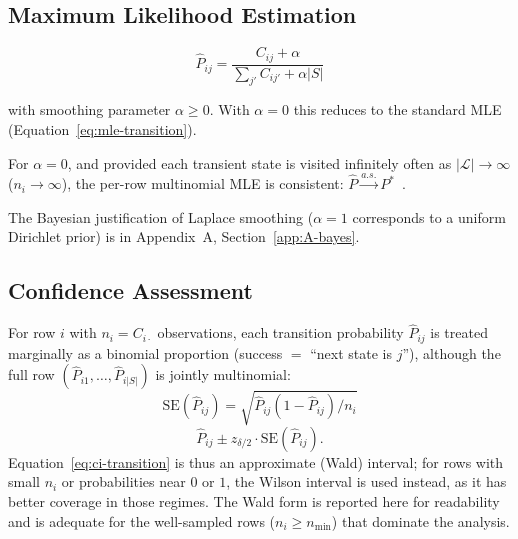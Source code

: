 \subsection{Maximum Likelihood Estimation}
\label{sec:s3-mle}

\begin{equation}
\label{eq:mle-full}
\hat{P}_{ij} = \frac{C_{ij} + \alpha}{\sum_{j'} C_{ij'} + \alpha |S|}
\end{equation}

with smoothing parameter $\alpha \geq 0$. With $\alpha = 0$ this reduces
to the standard MLE (Equation~\ref{eq:mle-transition}).

\begin{property}
\label{prop:mle-consistency}
For $\alpha = 0$, and provided each transient state is visited infinitely
often as $|\mathcal{L}| \to \infty$ ($n_i \to \infty$), the per-row
multinomial MLE is consistent: $\hat{P} \xrightarrow{a.s.}
P^*$~\cite{anderson1957statistical, billingsley1961statistical}.
\end{property}

The Bayesian justification of Laplace smoothing
($\alpha = 1$ corresponds to a uniform Dirichlet prior) is in
Appendix~A, Section~\ref{app:A-bayes}.


\subsection{Confidence Assessment}
\label{sec:s3-confidence}

For row $i$ with $n_i = C_{i \cdot}$ observations, each transition
probability $\hat{P}_{ij}$ is treated marginally as a binomial proportion
(success $=$ ``next state is $j$''), although the full row
$(\hat{P}_{i1}, \ldots, \hat{P}_{i|S|})$ is jointly multinomial:
\begin{equation}
\label{eq:se-transition}
\text{SE}(\hat{P}_{ij}) = \sqrt{\hat{P}_{ij}(1 - \hat{P}_{ij}) / n_i}
\end{equation}
\begin{equation}
\label{eq:ci-transition}
\hat{P}_{ij} \pm z_{\delta/2} \cdot \text{SE}(\hat{P}_{ij}).
\end{equation}
Equation~\ref{eq:ci-transition} is thus an approximate (Wald) interval; for
rows with small $n_i$ or probabilities near $0$ or $1$, the Wilson interval
is used instead, as it has better coverage in those regimes. The Wald form
is reported here for readability and is adequate for the well-sampled rows
($n_i \geq n_{\min}$) that dominate the analysis.


